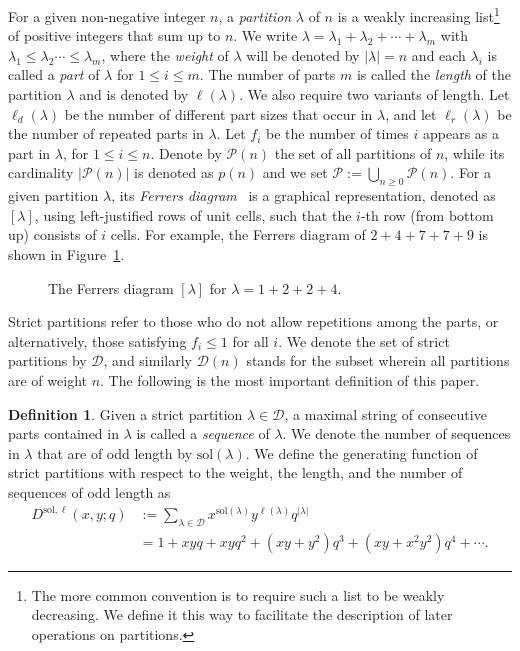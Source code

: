 \documentclass[11pt,reqno]{amsart}
\numberwithin{equation}{section}
\theoremstyle{plain}
\theoremstyle{definition}
\newtheorem{Def}[theorem]{Definition}
\newcommand{\abs}[1]{\left|#1\right|}
\def\sol{\mathrm{sol}}
\def\la{\lambda}
\newcommand{\D}{\mathcal{D}}
\renewcommand{\P}{\mathcal{P}}
\begin{document}
For a given non-negative integer $n$, a {\it partition} $\lambda$ of $n$ is a weakly increasing list\footnote{The more common convention is to require such a list to be weakly decreasing. We define it this way to facilitate the description of later operations on partitions.} of positive integers that sum up to $n$. We write $\lambda=\lambda_{1}+\lambda_{2}+\cdots+\lambda_{m}$ with $\lambda_{1}\leq \lambda_{2}\cdots\leq\lambda_{m}$, where the {\it weight} of $\lambda$ will be denoted by $|\lambda|=n$ and each $\lambda_{i}$ is called a {\it part} of $\lambda$ for $1\leq i\leq m$. The number of parts $m$ is called the {\it length} of the partition $\lambda$ and is denoted by $\ell(\lambda)$. We also require two variants of length. Let $\ell_d(\la)$ be the number of different part sizes that occur in $\la$, and let $\ell_r(\la)$ be the number of repeated parts in $\la$. Let $f_{i}$ be the number of times $i$ appears as a part in $\lambda$, for $1\leq i\leq n$. Denote by $\P(n)$ the set of all partitions of $n$, while its cardinality $|\P(n)|$ is denoted as $p(n)$ and we set $\P:=\bigcup_{n\ge 0}\P(n)$. For a given partition $\lambda$, its {\it Ferrers diagram}~\cite[p.~7]{andtp} is a graphical representation, denoted as $[\lambda]$, using left-justified rows of unit cells, such that the $i$-th row (from bottom up) consists of $i$ cells. For example, the Ferrers diagram of $2+4+7+7+9$ is shown in Figure~\ref{fig:Ferrers}. 
\begin{figure}[h!]
\begin{ferrers}
\end{ferrers}
\caption{The Ferrers diagram $[\lambda]$ for $\lambda=1+2+2+4$.}
\label{fig:Ferrers}
\end{figure}

Strict partitions refer to those who do not allow repetitions among the parts, or alternatively, those satisfying $f_i\le 1$ for all $i$. We denote the set of strict partitions by $\D$, and similarly $\D(n)$ stands for the subset wherein all partitions are of weight $n$. The following is the most important definition of this paper.

\begin{Def}
Given a strict partition $\la\in\D$, a maximal string of consecutive parts contained in $\la$ is called a {\it sequence} of $\la$. We denote the number of sequences in $\la$ that are of odd length by $\sol(\la)$. We define the generating function of strict partitions with respect to the weight, the length, and the number of sequences of odd length as
\begin{align*}
D^{\sol,\ell}(x,y;q) &:=\sum_{\la\in\D}x^{\sol(\la)}y^{\ell(\la)}q^{\abs{\la}}\\
&=1+xyq+xyq^2+(xy+y^2)q^3+(xy+x^2y^2)q^4+\cdots.
\end{align*}
\end{Def}
\end{document}
